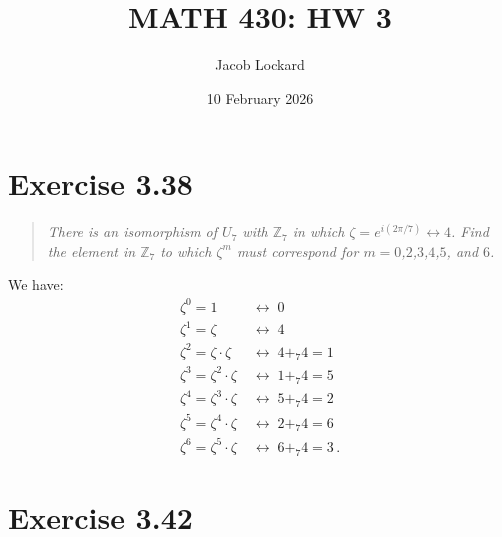 \documentclass{article}
\begin{document}
\title{MATH 430: HW 3}
\author{Jacob Lockard}
\date{10 February 2026}

\maketitle

\section*{Exercise 3.38}

\begin{quote}
    \itshape
    There is an isomorphism of $U_7$ with $\mathbb{Z}_7$ in which
    $\zeta = e^{i(2\pi/7)} \leftrightarrow 4$.
    Find the element in $\mathbb{Z}_7$ to which $\zeta^m$ must
    correspond for $m=0$,$2$,$3$,$4$,$5$, and $6$.
\end{quote}

We have:
\begin{align*}
    \zeta^0 = 1 \; &\leftrightarrow \; 0 \\
    \zeta^1 = \zeta \; &\leftrightarrow \; 4 \\
    \zeta^2 = \zeta \cdot \zeta \; &\leftrightarrow \; 4 +_7 4 = 1 \\
    \zeta^3 = \zeta^2 \cdot \zeta \; &\leftrightarrow \; 1 +_7 4 = 5 \\
    \zeta^4 = \zeta^3 \cdot \zeta \; &\leftrightarrow \; 5 +_7 4 = 2 \\
    \zeta^5 = \zeta^4 \cdot \zeta \; &\leftrightarrow \; 2 +_7 4 = 6 \\
    \zeta^6 = \zeta^5 \cdot \zeta \; &\leftrightarrow \; 6 +_7 4 = 3 \,.
\end{align*}

\section*{Exercise 3.42}
\end{document}
